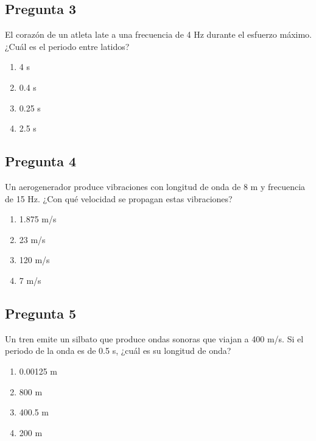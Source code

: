 \begin{preguntabox}
\section{Pregunta 3}
El corazón de un atleta late a una frecuencia de 4 Hz durante el esfuerzo máximo. ¿Cuál es el periodo entre latidos?

\begin{enumerate}
    \item[A)] 4 s
    \item[B)] 0.4 s
    \item[C)] 0.25 s
    \item[D)] 2.5 s
\end{enumerate}
\end{preguntabox}
\newpage
\begin{preguntabox}
\section{Pregunta 4}
Un aerogenerador produce vibraciones con longitud de onda de 8 m y frecuencia de 15 Hz. ¿Con qué velocidad se propagan estas vibraciones?

\begin{enumerate}
    \item[A)] 1.875 m/s
    \item[B)] 23 m/s
    \item[C)] 120 m/s
    \item[D)] 7 m/s
\end{enumerate}
\end{preguntabox}

\begin{preguntabox}
\section{Pregunta 5}
Un tren emite un silbato que produce ondas sonoras que viajan a 400 m/s. Si el periodo de la onda es de 0.5 s, ¿cuál es su longitud de onda?

\begin{enumerate}
    \item[A)] 0.00125 m
    \item[B)] 800 m
    \item[C)] 400.5 m
    \item[D)] 200 m
\end{enumerate}
\end{preguntabox}


